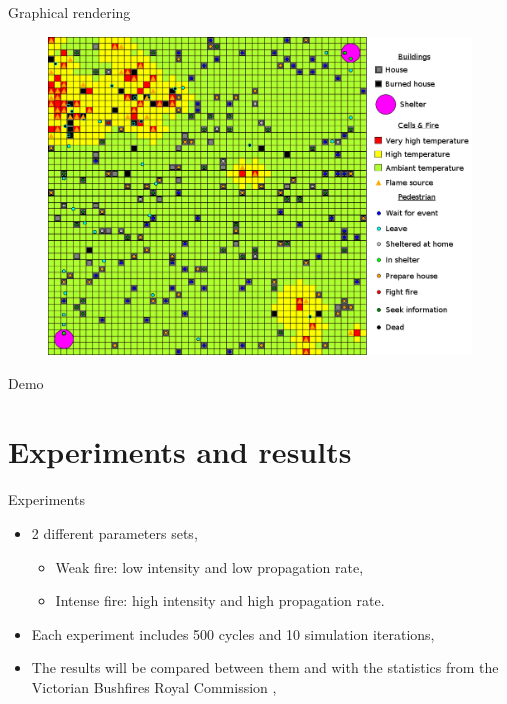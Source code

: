 \documentclass{beamer}
\begin{document}
    \begin{frame}{Graphical rendering}
      \vspace{-1em}
      \begin{figure}[h]
        \includegraphics[scale=0.35]{simu-legends.png}
      \end{figure}
    \end{frame}

    \begin{frame}{Demo}
      \begin{figure}
        \vspace{-1.8em}
        \hspace*{-2em}
      \end{figure}
    \end{frame}

  \section{Experiments and results}

    \begin{frame}{Experiments}
      \begin{itemize}
        \item 2 different parameters sets,
				\begin{itemize}
					\item Weak fire: low intensity and low propagation rate,
					\item Intense fire: high intensity and high propagation rate.
				\end{itemize}
        \item Each experiment includes 500 cycles and 10 simulation iterations,
        \item The results will be compared between them and with the statistics from the Victorian Bushfires Royal Commission \cite{stats2009},
      \end{itemize}
    \end{frame}
\end{document}
